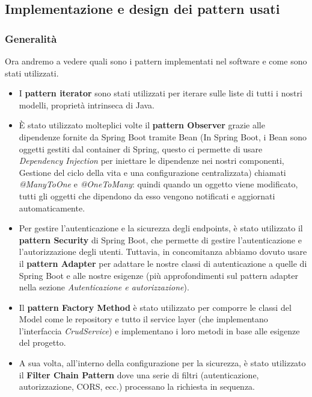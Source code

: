 \documentclass[a4paper]{article}
\begin{document}
\subsection{Implementazione e design dei pattern usati}

\subsubsection{Generalità}

Ora andremo a vedere quali sono i pattern implementati nel software e come sono stati utilizzati.

\begin{itemize}
  \item I \textbf{pattern iterator} sono stati utilizzati per iterare sulle liste di tutti i nostri modelli, proprietà intrinseca
  di Java. 
  \item È stato utilizzato molteplici volte il \textbf{pattern Observer} grazie alle dipendenze fornite da Spring Boot 
  tramite Bean (In Spring Boot, i Bean sono oggetti gestiti dal container di Spring, questo ci permette
  di usare \textit{Dependency Injection} per iniettare le dipendenze nei nostri componenti, Gestione
  del ciclo della vita e una configurazione centralizzata) 
  chiamati \textit{@ManyToOne} e \textit{@OneToMany}: quindi quando un oggetto viene modificato,
  tutti gli oggetti che dipendono da esso vengono notificati e aggiornati automaticamente.
  \item Per gestire l'autenticazione e la sicurezza degli endpoints, è stato utilizzato il \textbf{pattern Security} di Spring Boot,
  che permette di gestire l'autenticazione e l'autorizzazione degli utenti. Tuttavia, in concomitanza abbiamo dovuto usare 
  il \textbf{pattern Adapter} per adattare le nostre classi di autenticazione a quelle di Spring Boot e alle nostre esigenze
  (più approfondimenti sul pattern adapter nella sezione \textit{Autenticazione e autorizzazione}).
  \item Il \textbf{pattern Factory Method} è stato utilizzato per comporre le classi del Model come le repository
  e tutto il service layer (che implementano l'interfaccia \textit{CrudService}) e implementano i loro metodi in base 
  alle esigenze del progetto.
  \item A sua volta, all'interno della configurazione per la sicurezza, è stato utilizzato il \textbf{Filter Chain Pattern}
  dove una serie di filtri (autenticazione, autorizzazione, CORS, ecc.) processano la richiesta in sequenza.
\end{itemize}
\end{document}
